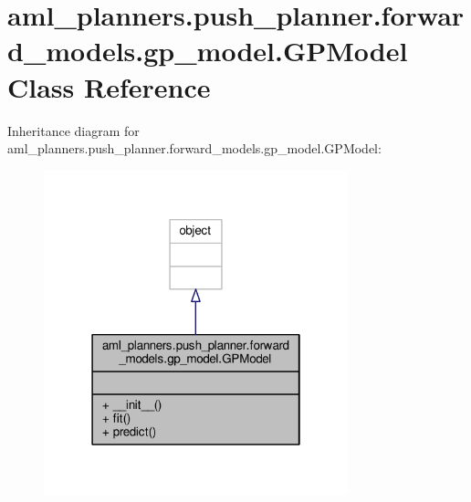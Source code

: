\hypertarget{classaml__planners_1_1push__planner_1_1forward__models_1_1gp__model_1_1_g_p_model}{\section{aml\-\_\-planners.\-push\-\_\-planner.\-forward\-\_\-models.\-gp\-\_\-model.\-G\-P\-Model Class Reference}
\label{classaml__planners_1_1push__planner_1_1forward__models_1_1gp__model_1_1_g_p_model}
}


Inheritance diagram for aml\-\_\-planners.\-push\-\_\-planner.\-forward\-\_\-models.\-gp\-\_\-model.\-G\-P\-Model\-:\nopagebreak
\begin{figure}[H]
\begin{center}
\leavevmode
\includegraphics[width=250pt]{classaml__planners_1_1push__planner_1_1forward__models_1_1gp__model_1_1_g_p_model__inherit__graph}
\end{center}
\end{figure}


